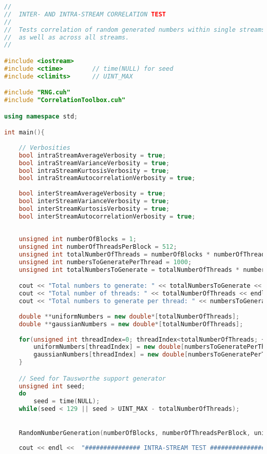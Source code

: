 \begin{lstlisting}[language=C++, caption={\texttt{libraries/CoreLibraries/RandomGenerator/CorrelationTest.cu}}]
//
//	INTER- AND INTRA-STREAM CORRELATION TEST
//
//	Tests correlation of random generated numbers within single streams
//	as well as across all streams.
//

#include <iostream>
#include <ctime>		// time(NULL) for seed
#include <climits>		// UINT_MAX

#include "RNG.cuh"
#include "CorrelationToolbox.cuh"

using namespace std;

int main(){
	
	// Verbosities
	bool intraStreamAverageVerbosity = true;
	bool intraStreamVarianceVerbosity = true;
	bool intraStreamKurtosisVerbosity = true;
	bool intraStreamAutocorrelationVerbosity = true;
	
	bool interStreamAverageVerbosity = true;
	bool interStreamVarianceVerbosity = true;
	bool interStreamKurtosisVerbosity = true;
	bool interStreamAutocorrelationVerbosity = true;
	
	
	unsigned int numberOfBlocks = 1;
	unsigned int numberOfThreadsPerBlock = 512;
	unsigned int totalNumberOfThreads = numberOfBlocks * numberOfThreadsPerBlock;
	unsigned int numbersToGeneratePerThread = 1000;
	unsigned int totalNumbersToGenerate = totalNumberOfThreads * numbersToGeneratePerThread;

	cout << "Total numbers to generate: " << totalNumbersToGenerate << endl;
	cout << "Total number of threads: " << totalNumberOfThreads << endl;
	cout << "Total numbers to generate per thread: " << numbersToGeneratePerThread << endl;
	
	double **uniformNumbers = new double*[totalNumberOfThreads];
	double **gaussianNumbers = new double*[totalNumberOfThreads];
	
	for(unsigned int threadIndex=0; threadIndex<totalNumberOfThreads; ++threadIndex){
		uniformNumbers[threadIndex] = new double[numbersToGeneratePerThread];
		gaussianNumbers[threadIndex] = new double[numbersToGeneratePerThread];
	}

	// Seed for Tausworthe support generator
	unsigned int seed;	
	do
		seed = time(NULL);
	while(seed < 129 || seed > UINT_MAX - totalNumberOfThreads);
	

	RandomNumberGeneration(numberOfBlocks, numberOfThreadsPerBlock, uniformNumbers, gaussianNumbers, totalNumbersToGenerate, numbersToGeneratePerThread, seed);
	
	cout << endl <<  "############### INTRA-STREAM TEST ###############" << endl;
	

\end{lstlisting}
